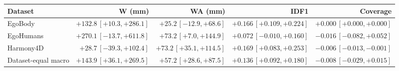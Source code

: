 \begin{tabular}{lrrrr}
\toprule
Dataset & W (mm) & WA (mm) & IDF1 & Coverage \\
\midrule
EgoBody & $+132.8\,[+10.3,+286.1]$ & $+25.2\,[-12.9,+68.6]$ & $+0.166\,[+0.109,+0.224]$ & $+0.000\,[+0.000,+0.000]$ \\
EgoHumans & $+270.1\,[-13.7,+611.8]$ & $+73.2\,[+7.0,+144.9]$ & $+0.072\,[-0.010,+0.160]$ & $-0.016\,[-0.082,+0.052]$ \\
Harmony4D & $+28.7\,[-39.3,+102.4]$ & $+73.2\,[+35.1,+114.5]$ & $+0.169\,[+0.083,+0.253]$ & $-0.006\,[-0.013,-0.001]$ \\
\midrule
Dataset-equal macro & $+143.9\,[+36.1,+269.5]$ & $+57.2\,[+28.6,+87.5]$ & $+0.136\,[+0.092,+0.180]$ & $-0.008\,[-0.029,+0.015]$ \\
\bottomrule
\end{tabular}
